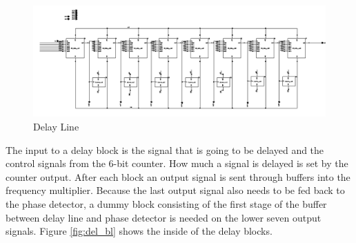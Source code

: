\documentclass[a4paper,12pt]{article} \usepackage{graphicx}
\begin{document}
\begin{figure}[h]
        \centering
        \includegraphics[width=\textwidth]{../Bilder/Delay_Line/Delay_line_top.png}
        \caption{Delay Line}
        \label{fig:del_line}
\end{figure}
The input to a delay block is the signal that is going
to be delayed and the control signals from the 6-bit counter. How much a signal
is delayed is set by the counter output. After each block an output signal is sent
through buffers into the frequency multiplier. Because the last output signal
also needs to be fed back to the phase detector, a dummy block consisting of the
first stage of the buffer between delay line and phase detector is needed on
the lower seven output signals. Figure \ref{fig:del_bl} shows the inside of
the delay blocks.
\end{document}
